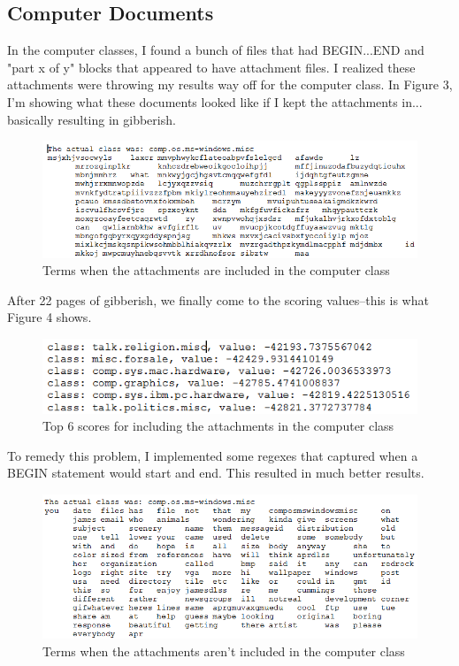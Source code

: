 \documentclass[11pt]{article}
\begin{document}
\subsection{Computer Documents}
In the computer classes, I found a bunch of files that had BEGIN...END and "part x of y" blocks that appeared to have attachment files.  I realized these attachments were throwing my results way off for the computer class.  In Figure 3, I'm showing what these documents looked like if I kept the attachments in... basically resulting in gibberish.
\begin{figure}[h]
\begin{center}
\includegraphics[scale=.8]{withattach.png}
\caption{Terms when the attachments are included in the computer class}
\end{center}
\end{figure}
\newline
After 22 pages of gibberish, we finally come to the scoring values--this is what Figure 4 shows.
\begin{figure}[h!]
\begin{center}
\includegraphics[scale=.8]{withattachscore.png}
\caption{Top 6 scores for including the attachments in the computer class}
\end{center}
\end{figure}
\newline
To remedy this problem, I implemented some regexes that captured when a BEGIN statement would start and end.  This resulted in much better results.
\begin{figure}[h]
\begin{center}
\includegraphics[scale=.8]{withoutattach.png}
\caption{Terms when the attachments aren't included in the computer class}
\end{center}
\end{figure}
\end{document}
